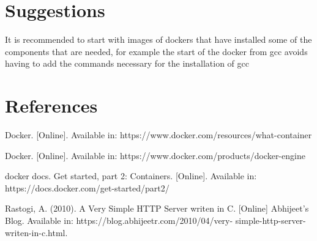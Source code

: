 \documentclass{article}
\begin{document}
\section{Suggestions}
It is recommended to start with images of dockers that have installed some of the components that are needed, for example the start of the docker from gcc avoids having to add the commands necessary for the installation of gcc
\section{References}
\begin{thebibliography}{1}

Docker. [Online]. Available in: https://www.docker.com/resources/what-container

Docker. [Online]. Available in: https://www.docker.com/products/docker-engine

docker docs. Get started, part 2: Containers. [Online]. Available in: https://docs.docker.com/get-started/part2/

Rastogi, A. (2010). A Very Simple HTTP Server writen in C. [Online]
Abhijeet’s Blog. Available in: https://blog.abhijeetr.com/2010/04/very-
simple-http-server-writen-in-c.html.


\end{thebibliography}
\end{document}
